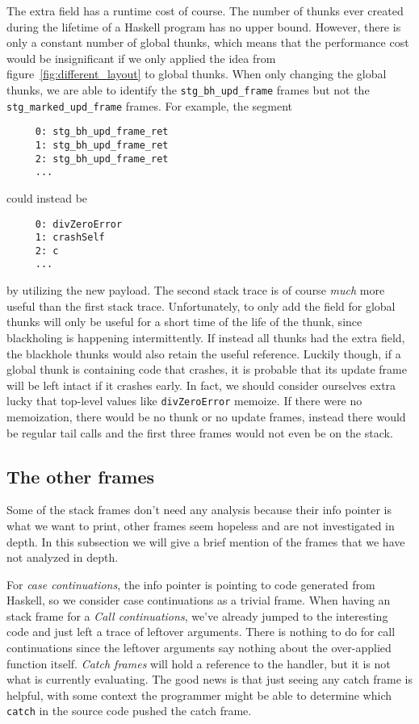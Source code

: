 The extra field has a runtime cost of course. The number of thunks
ever created during the lifetime of a Haskell program has no upper bound. However,
there is only a constant number of global thunks, which means that the
performance cost would be insignificant if we only applied the idea from
figure~\ref{fig:different_layout} to global thunks. When
only changing the global thunks, we are able to identify
the \texttt{stg\_bh\_upd\_frame} frames but not the
\texttt{stg\_marked\_upd\_frame} frames. For example, the
segment

\begin{verbatim}
     0: stg_bh_upd_frame_ret
     1: stg_bh_upd_frame_ret
     2: stg_bh_upd_frame_ret
     ...
\end{verbatim}

could instead be

\begin{verbatim}
     0: divZeroError
     1: crashSelf
     2: c
     ...
\end{verbatim}

by utilizing the new payload. The second stack trace is of course
\emph{much} more useful than the first stack trace. Unfortunately,
to only add the field for global thunks will only be useful for a
short time of the life of the thunk, since blackholing is happening
intermittently. If instead all thunks had the extra field, the blackhole
thunks would also retain the useful reference. Luckily though, if a
global thunk is containing code that crashes, it is probable that its
update frame will be left intact if it crashes early. In
fact, we should consider ourselves extra lucky that top-level values
like \texttt{divZeroError} memoize. If there were no memoization,
there would be no thunk or no update frames, instead there would be
regular tail calls and the first three frames would not even be on the stack.

\subsection{The other frames} \label{sec:the_other_frames}

Some of the stack frames don't need any analysis because their info
pointer is what we want to print, other frames seem hopeless and are not
investigated in depth. In this subsection we will give a brief mention
of the frames that we have not analyzed in depth.

For \emph{case continuations}, the info pointer is pointing to code
generated from Haskell, so we consider case continuations as a
trivial frame. When having an stack frame for a \emph{Call continuations}, we've already
jumped to the interesting code and just left a trace of leftover arguments.
There is nothing to do for call continuations since the leftover arguments
say nothing about the over-applied function itself.
\emph{Catch frames} will hold a reference to the handler, but it is
not what is currently evaluating. The good news is that just seeing
any catch frame is helpful, with some context the programmer might be
able to determine which \texttt{catch} in the source code pushed the
catch frame.


